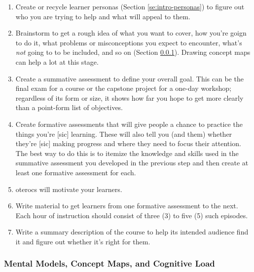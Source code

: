 \documentclass[010-intro.tex]{subfiles}
\begin{document}
        \begin{enumerate}[label=\textbf{L.\arabic*}]
            \item \label{enum:persona} Create or recycle learner personas (Section \ref{se:intro-personas})
                  to figure out who you are trying to help and what will appeal to them.
            \item \label{enum:brainstorm} Brainstorm to get a rough idea of what you want to cover,
                  how you're goign to do it,
                  what problems or misconceptions you expect to encounter,
                  what's \emph{not} going to to be included, and so on (Section \ref{sse:concept-maps}).
                  Drawing concept maps can help a lot at this stage.
            \item \label{enum:summative} Create a summative assessment to define your overall goal.
                  This can be the final exam for a course or the capstone project for a one-day workshop;
                  regardless of its form or size, it shows how far you hope to get more clearly than a point-form list of objectives.
            \item \label{enum:formative} Create formative assessments that will give people a chance to practice the things you're [sic] learning.
                  These will also tell you (and them) whether they're [sic] making progress and where they need to focus their attention.
                  The best way to do this is to itemize the knowledge and skills used in the summative assessment you developed in the previous step
                  and then create at least one formative assessment for each.
            \item \label{enum:outline} oterocs will motivate your learners.
            \item \label{enum:content} Write material to get learners from one formative assessment to the next.
                  Each hour of instruction should consist of three (3) to five (5) such episodes.
            \item \label{enum:summary} Write a summary description of the course to help its intended audience find it and figure out whether it's right for them.
        \end{enumerate}

    \subsubsection{Mental Models, Concept Maps, and Cognitive Load}
        \label{sse:concept-maps}
\end{document}
